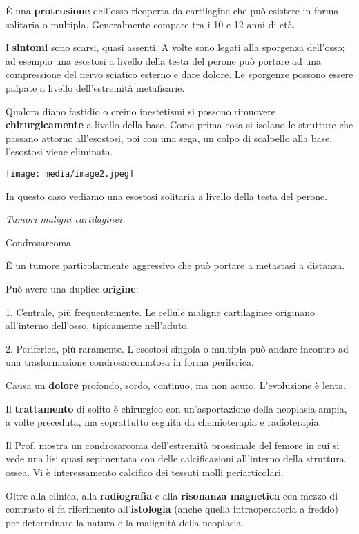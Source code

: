 È una \textbf{protrusione} dell'osso ricoperta da cartilagine che può
esistere in forma solitaria o multipla. Generalmente compare tra i 10 e
12 anni di età.

I \textbf{sintomi} sono scarsi, quasi assenti. A volte sono legati alla
sporgenza dell'osso; ad esempio una esostosi a livello della testa del
perone può portare ad una compressione del nervo sciatico esterno e dare
dolore. Le sporgenze possono essere palpate a livello dell'estremità
metafisarie.

Qualora diano fastidio o creino inestetismi si possono rimuovere
\textbf{chirurgicamente} a livello della base. Come prima cosa si
isolano le strutture che passano attorno all'esostosi, poi con una sega,
un colpo di scalpello alla base, l'esostosi viene eliminata.

\texttt{[image: media/image2.jpeg]}

In questo caso vediamo una esostosi solitaria a livello della testa del
perone.

\emph{Tumori maligni cartilaginei}

Condrosarcoma

È un tumore particolarmente aggressivo che può portare a metastasi a
distanza.

Può avere una duplice \textbf{origine}:

1. Centrale, più frequentemente. Le cellule maligne cartilaginee
originano all'interno dell'osso, tipicamente nell'aduto.

2. Periferica, più raramente. L'esostosi singola o multipla può andare
incontro ad una trasformazione condrosarcomatosa in forma periferica.

Causa un \textbf{dolore} profondo, sordo, continuo, ma non acuto.
L'evoluzione è lenta.

Il \textbf{trattamento} di solito è chirurgico con un'asportazione della
neoplasia ampia, a volte preceduta, ma soprattutto seguita da
chemioterapia e radioterapia.

Il Prof. mostra un condrosarcoma dell'estremità prossimale del femore in
cui si vede una lisi quasi sepimentata con delle calcificazioni
all'interno della struttura ossea. Vi è interessamento calcifico dei
tessuti molli periarticolari.

Oltre alla clinica, alla \textbf{radiografia} e alla \textbf{risonanza
magnetica} con mezzo di contrasto si fa riferimento
all'\textbf{istologia} (anche quella intraoperatoria a freddo) per
determinare la natura e la malignità della neoplasia.

